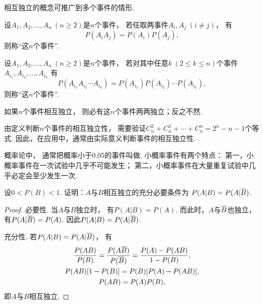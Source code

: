 相互独立的概念可推广到多个事件的情形.
\begin{definition}
设\(A_1,A_2,\dotsc,A_n\ (n \geq 2)\)是\(n\)个事件，
若任取两事件\(A_i,A_j\ (i \neq j)\)，
有\begin{equation*}
	P(A_i A_j) = P(A_i) P(A_j),
\end{equation*}
则称“这\(n\)个事件”.
\end{definition}

\begin{definition}
设\(A_1,A_2,\dotsc,A_n\ (n \geq 2)\)是\(n\)个事件，
若对其中任意\(k\ (2 \leq k \leq n)\)个事件\(A_{i_1},A_{i_2},\dotsc,A_{i_k}\)
有\begin{equation*}
	P(A_{i_1} A_{i_2} \dotsm A_{i_k})
	= P(A_{i_1}) P(A_{i_2}) \dotsm P(A_{i_k}),
\end{equation*}
则称“这\(n\)个事件”.
\end{definition}

\begin{theorem}
如果\(n\)个事件相互独立，
则必有这\(n\)个事件两两独立；反之不然.
\end{theorem}

由定义判断\(n\)个事件的相互独立性，
需要验证\(C_n^2+C_n^3+\dotsb+C_n^n=2^n-n-1\)个等式.
因此，在应用中，通常由实际意义判断事件的相互独立性.

概率论中，
通常把概率小于0.05的事件叫做.
小概率事件有两个特点：
第一，小概率事件在一次试验中几乎不可能发生；
第二，小概率事件在大量重复试验中几乎必定会至少发生一次.

\begin{example}
设\(0<P(B)<1\).
证明：\(A\)与\(B\)相互独立的充分必要条件为
\(P(A \vert B) = P(A \vert \SetComplementaryL{B})\).
\begin{proof}
必要性.
当\(A\)与\(B\)独立时，
有\(P(A \vert B) = P(A)\).
而此时，\(A\)与\(\SetComplementaryL{B}\)也独立，
有\(P(A \vert \SetComplementaryL{B}) = P(A)\).
因此\(P(A \vert B) = P(A \vert \SetComplementaryL{B})\).

充分性.
若\(P(A \vert B) = P(A \vert \SetComplementaryL{B})\)，
有\begin{gather*}
	\frac{P(AB)}{P(B)}
	= \frac{P(A\SetComplementaryL{B})}{P(\SetComplementaryL{B})}
	= \frac{P(A)-P(AB)}{1-P(B)}, \\
	P(AB) [1-P(B)] = P(B) [P(A)-P(AB)], \\
	P(AB) = P(A) P(B),
\end{gather*}
即\(A\)与\(B\)相互独立.
\end{proof}
\end{example}


